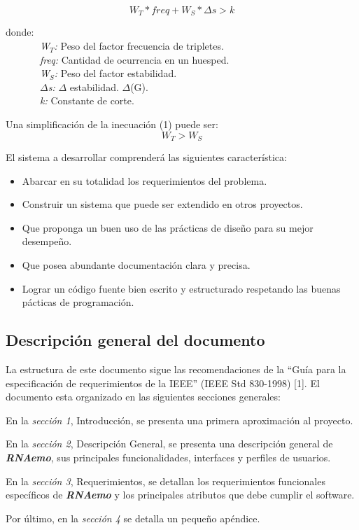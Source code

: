 \documentclass[10pt,a4paper,english,spanish]{article}
\newcommand{\rnaemo}{\textbf{\emph{RNAemo}}}
\begin{document}
\begin{equation} 
W_T * freq + W_S * \Delta s > k 
\end{equation}
\begin{flushleft}
donde: \\
\ \ \ \ \ \ \ \textit{W$_T$:} Peso del factor frecuencia de tripletes.\\
\ \ \ \ \ \ \ \textit{freq:} Cantidad de ocurrencia en un huesped.\\
\ \ \ \ \ \ \ \textit{W$_S$:} Peso del factor estabilidad. \\
\ \ \ \ \ \ \ \textit{$\Delta$s:} $\Delta$ estabilidad. $\Delta$(G).\\
\ \ \ \ \ \ \ \textit{k:} Constante de corte.
\end{flushleft}
Una simplificación de la inecuación (1) puede ser: \\
\begin{displaymath}
W_T > W_S               
\end{displaymath}


\par El sistema a desarrollar comprenderá las siguientes característica:
\begin{itemize}
	\item Abarcar en su totalidad los requerimientos del problema.
	\item Construir un sistema que puede ser extendido en otros proyectos. 
	\item Que proponga un buen uso de las prácticas de diseño para su mejor desempeño.
	\item Que posea abundante documentación clara y precisa.
	\item Lograr un código fuente bien escrito y estructurado respetando las buenas pácticas de programación.
\end{itemize}

\subsection{Descripción general del documento}
\par La estructura de este documento sigue las recomendaciones de la ``Guía para
la especificación de requerimientos de la IEEE'' (IEEE Std 830-1998) [1].
El documento esta organizado en las siguientes secciones generales: 
\par En la \textit{sección 1}, Introducción, se presenta una primera aproximación al proyecto. 
\par En la \textit{sección 2}, Descripción General, se presenta una descripción general de \rnaemo, sus principales
funcionalidades, interfaces y perfiles de usuarios. 
\par En la \textit{sección 3}, Requerimientos, se detallan los requerimientos funcionales específicos de \textbf{\emph{RNAemo}} y
 los principales atributos que debe cumplir el software.
\par Por último, en la \textit{sección 4} se detalla un pequeño apéndice.
\end{document}
